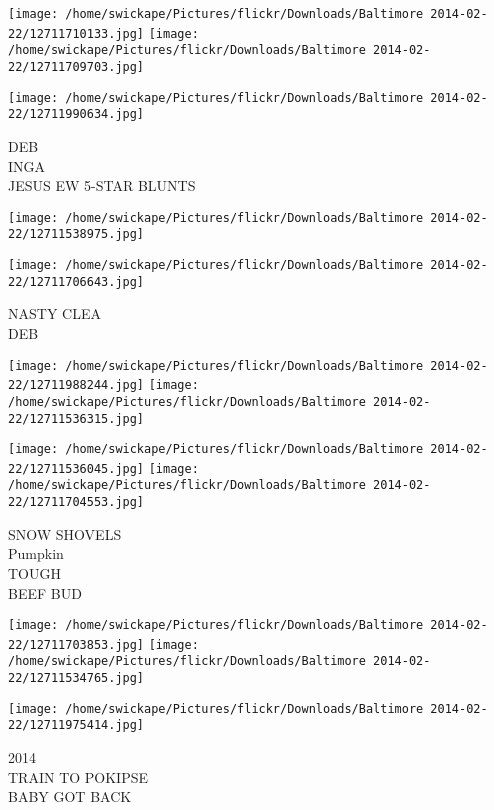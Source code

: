 \documentclass[10pt,letterpaper]{article}
\begin{document}
\texttt{[image: /home/swickape/Pictures/flickr/Downloads/Baltimore 2014-02-22/12711710133.jpg]}
\texttt{[image: /home/swickape/Pictures/flickr/Downloads/Baltimore 2014-02-22/12711709703.jpg]}

\texttt{[image: /home/swickape/Pictures/flickr/Downloads/Baltimore 2014-02-22/12711990634.jpg]}

DEB\\
INGA\\
JESUS EW 5{-}STAR BLUNTS\\
\pagebreak

\texttt{[image: /home/swickape/Pictures/flickr/Downloads/Baltimore 2014-02-22/12711538975.jpg]}

\vspace{0.25in}
\texttt{[image: /home/swickape/Pictures/flickr/Downloads/Baltimore 2014-02-22/12711706643.jpg]}

NASTY CLEA\\
DEB\\
\pagebreak

\texttt{[image: /home/swickape/Pictures/flickr/Downloads/Baltimore 2014-02-22/12711988244.jpg]}
\texttt{[image: /home/swickape/Pictures/flickr/Downloads/Baltimore 2014-02-22/12711536315.jpg]}

\texttt{[image: /home/swickape/Pictures/flickr/Downloads/Baltimore 2014-02-22/12711536045.jpg]}
\texttt{[image: /home/swickape/Pictures/flickr/Downloads/Baltimore 2014-02-22/12711704553.jpg]}

SNOW SHOVELS\\
Pumpkin\\
TOUGH\\
BEEF BUD\\
\pagebreak

\texttt{[image: /home/swickape/Pictures/flickr/Downloads/Baltimore 2014-02-22/12711703853.jpg]}
\texttt{[image: /home/swickape/Pictures/flickr/Downloads/Baltimore 2014-02-22/12711534765.jpg]}

\vspace{0.25in}
\texttt{[image: /home/swickape/Pictures/flickr/Downloads/Baltimore 2014-02-22/12711975414.jpg]}

2014\\
TRAIN TO POKIPSE\\
BABY GOT BACK\\
\pagebreak
\end{document}
